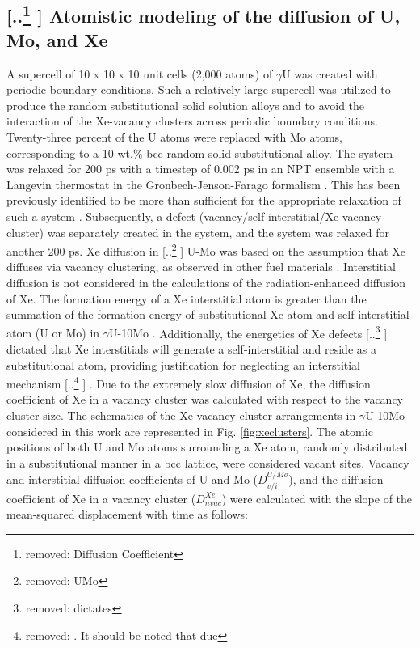 \documentclass[preprint,12pt]{elsarticle}
\providecommand{\DIFadd}[1]{{\protect\color{blue} \sf #1}} %
\providecommand{\DIFdel}[1]{{\protect\color{red} [..\footnote{removed: #1} ]}} %
\providecommand{\DIFaddbegin}{} %
\providecommand{\DIFaddend}{} %
\providecommand{\DIFdelbegin}{} %
\providecommand{\DIFdelend}{} %
\newcommand{\DIFscaledelfig}{0.5}
\newlength{\DIFdelgraphicswidth} %
\newlength{\DIFdelgraphicsheight} %
\newcommand{\DIFaddincludegraphics}[2][]{{\color{blue}\fbox{\DIFOincludegraphics[#1]{#2}}}} %
\newcommand{\DIFdelincludegraphics}[2][]{%
\sbox{\DIFdelgraphicsbox}{\DIFOincludegraphics[#1]{#2}}%
\settoboxwidth{\DIFdelgraphicswidth}{\DIFdelgraphicsbox} %
\settoboxtotalheight{\DIFdelgraphicsheight}{\DIFdelgraphicsbox} %
\scalebox{\DIFscaledelfig}{%
\parbox[b]{\DIFdelgraphicswidth}{\usebox{\DIFdelgraphicsbox}\\[-\baselineskip] \rule{\DIFdelgraphicswidth}{0em}}\llap{\resizebox{\DIFdelgraphicswidth}{\DIFdelgraphicsheight}{%
\setlength{\unitlength}{\DIFdelgraphicswidth}%
\begin{picture}(1,1)%
\thicklines\linethickness{2pt} %
{\color[rgb]{1,0,0}\put(0,0){\framebox(1,1){}}}%
{\color[rgb]{1,0,0}\put(0,0){\line( 1,1){1}}}%
{\color[rgb]{1,0,0}\put(0,1){\line(1,-1){1}}}%
\end{picture}%
}\hspace*{3pt}}} %
} %
\DeclareRobustCommand{\DIFaddbegin}{\DIFOaddbegin \let\includegraphics\DIFaddincludegraphics} %
\DeclareRobustCommand{\DIFaddend}{\DIFOaddend \let\includegraphics\DIFOincludegraphics} %
\DeclareRobustCommand{\DIFdelbegin}{\DIFOdelbegin \let\includegraphics\DIFdelincludegraphics} %
\DeclareRobustCommand{\DIFdelend}{\DIFOaddend \let\includegraphics\DIFOincludegraphics} %
\begin{document}
\subsection{\DIFdelbegin \DIFdel{Diffusion Coefficient }\DIFdelend \DIFaddbegin \DIFadd{Atomistic modeling }\DIFaddend of \DIFaddbegin \DIFadd{the diffusion of }\DIFaddend U, Mo, and Xe}
\label{sec:DC_UMoXe}
\indent A supercell of 10 x 10 x 10 unit cells (2,000 atoms) of $\gamma$U was created with periodic boundary conditions. Such a relatively large supercell was utilized to produce the random substitutional solid solution alloys and to avoid the interaction of the Xe-vacancy clusters across periodic boundary conditions. Twenty-three percent of the U atoms were replaced with Mo atoms, corresponding to a 10 wt.$\%$ bcc random solid substitutional alloy. The system was relaxed for 200 ps with a timestep of 0.002 ps in an NPT ensemble with a Langevin thermostat in the Gronbech-Jenson-Farago formalism \cite{gronbech2013simple, gronbech2014application}. This has been previously identified to be more than sufficient for the appropriate relaxation of such a system \cite{park2021atomistic}. Subsequently, a defect (vacancy/self-interstitial/Xe-vacancy cluster) was separately created in the system, and the system was relaxed for another 200 ps. Xe diffusion in \DIFdelbegin \DIFdel{UMo }\DIFdelend \DIFaddbegin \DIFadd{U-Mo }\DIFaddend was based on the assumption that Xe diffuses via vacancy clustering, as observed in other fuel materials \cite{perriot2019atomistic, andersson2019density, andersson2011u, thompson2013pathway, bes2015experimental}. \DIFaddbegin \DIFadd{Interstitial diffusion is not considered in the calculations of the radiation-enhanced diffusion of Xe. The formation energy of a Xe interstitial atom is greater than the summation of the formation energy of substitutional Xe atom and self-interstitial atom (U or Mo) in $\gamma$U-10Mo \cite{beeler2011formation, beeler2012first, beeler2020improved}. }\DIFaddend Additionally, the energetics of Xe defects \DIFdelbegin \DIFdel{dictates }\DIFdelend \DIFaddbegin \DIFadd{dictated }\DIFaddend that Xe interstitials will generate a self-interstitial and reside as a substitutional atom, providing justification for neglecting an interstitial mechanism  \DIFdelbegin \DIFdel{\cite{beeler2011formation, beeler2012first}.  It should be noted that due }\DIFdelend \DIFaddbegin \DIFadd{\cite{beeler2011formation, beeler2012first, beeler2020improved}.  Due }\DIFaddend to the extremely slow diffusion of Xe, the diffusion coefficient of Xe in a vacancy cluster was calculated with respect to the vacancy cluster size. The schematics of the Xe-vacancy cluster arrangements in $\gamma$U-10Mo considered in this work are represented in Fig. \ref{fig:xeclusters}. \DIFaddbegin \DIFadd{The atomic positions of both U and Mo atoms surrounding a Xe atom, randomly distributed in a substitutional manner in a bcc lattice, were considered vacant sites. }\DIFaddend Vacancy and interstitial diffusion coefficients of U and Mo ($D_{v/i}^{U/Mo}$), and the diffusion coefficient of Xe in a vacancy cluster ($D_{nvac}^{Xe}$) were calculated with the slope of the mean-squared displacement with time as follows:
\\
\end{document}
